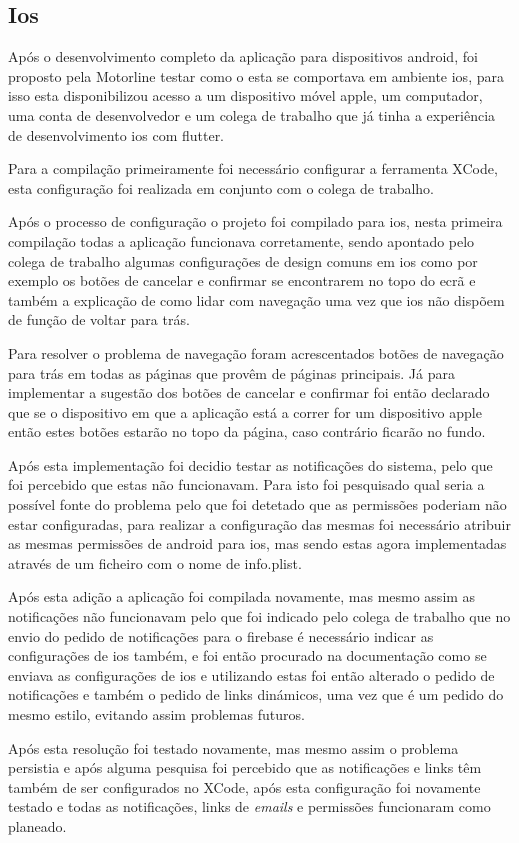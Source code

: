 \subsection{Ios}
Após o desenvolvimento completo da aplicação para dispositivos android, foi proposto pela Motorline testar como o esta se comportava em ambiente ios, para isso esta disponibilizou acesso a um dispositivo móvel apple, um computador, uma conta de desenvolvedor e um colega de trabalho que já tinha a experiência de desenvolvimento ios com flutter.

Para a compilação primeiramente foi necessário configurar a ferramenta XCode, esta configuração foi realizada em conjunto com o colega de trabalho.

Após o processo de configuração o projeto foi compilado para ios, nesta primeira compilação todas a aplicação funcionava corretamente, sendo apontado pelo colega de trabalho algumas configurações de design comuns em ios como por exemplo os botões de cancelar e confirmar se encontrarem no topo do ecrã e também a explicação de como lidar com navegação uma vez que ios não dispõem de função de voltar para trás.

Para resolver o problema de navegação foram acrescentados botões de navegação para trás em todas as páginas que provêm de páginas principais. Já para implementar a sugestão dos botões de cancelar e confirmar foi então declarado que se o dispositivo em que a aplicação está a correr for um dispositivo apple então estes botões estarão no topo da página, caso contrário ficarão no fundo.

Após esta implementação foi decidio testar as notificações do sistema, pelo que foi percebido que estas não funcionavam. Para isto foi pesquisado qual seria a possível fonte do problema pelo que foi detetado que as permissões poderiam não estar configuradas, para realizar a configuração das mesmas foi necessário atribuir as mesmas permissões de android para ios, mas sendo estas agora implementadas através de um ficheiro com o nome de info.plist.

Após esta adição a aplicação foi compilada novamente, mas mesmo assim as notificações não funcionavam pelo que foi indicado pelo colega de trabalho que no envio do pedido de notificações para o firebase é necessário indicar as configurações de ios também, e foi então procurado na documentação como se enviava as configurações de ios e utilizando estas foi então alterado o pedido de notificações e também o pedido de links dinámicos, uma vez que é um pedido do mesmo estilo, evitando assim problemas futuros.

Após esta resolução foi testado novamente, mas mesmo assim o problema persistia e após alguma pesquisa foi percebido que as notificações e links têm também de ser configurados no XCode, após esta configuração foi novamente testado e todas as notificações, links de \textit{emails} e permissões funcionaram como planeado.